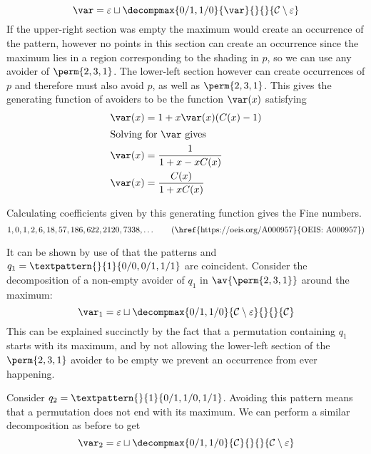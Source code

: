 \begin{equation*}
    \scriptvar = \varepsilon \sqcup
\decompmax{0/1,1/0}{\scriptvar}{}{}{\mathcal{C}\setminus\varepsilon}
\end{equation*}
If the upper-right section was empty the maximum would create an
occurrence of the pattern, however no points in this section can create
an occurrence since the maximum lies in a region corresponding to the
shading in \(p\), so we can use any avoider of \(\perm{2,3,1}\). The lower-left
section however can create occurrences
of \(p\) and therefore must also avoid \(p\), as well as \(\perm{2,3,1}\).
This gives the generating function of avoiders to be the function \(\var(x)\)
satisfying
\begin{align*}
    \var(x) &= 1 + x\var(x)(C(x)-1) \\
    \shortintertext{Solving for \(\var\) gives}
    \var(x) &= \frac{1}{1+x-xC(x)}\\
    \var(x) &= \frac{C(x)}{1+xC(x)}
\end{align*} %

\noindent
Calculating coefficients given by this generating function gives the Fine
numbers.
\begin{equation*}
    1, 0, 1, 2, 6, 18, 57, 186, 622, 2120, 7338,\dotsc
\tag{\href{https://oeis.org/A000957}{OEIS: A000957}}
\end{equation*}

\nextvar[\varfine]
It can be shown by use of  that the patterns
 and \(q_1 = \textpattern{}{1}{0/0,0/1,1/1}\) are
coincident. Consider the decomposition of a non-empty avoider of \(q_1\) in
\(\av{\perm{2,3,1}}\) around the maximum:
\begin{equation*}
    \scriptvar_1 =\varepsilon \sqcup
\decompmax{0/1,1/0}{\mathcal{C}\setminus\varepsilon}{}{}{\mathcal{C}}
\end{equation*}
This can be explained succinctly by the fact that a permutation containing
\(q_1\) starts with its maximum, and by not allowing the lower-left section of the
\(\perm{2,3,1}\) avoider to be empty we prevent an occurrence from ever
happening.

Consider \(q_2 = \textpattern{}{1}{0/1,1/0,1/1}\). Avoiding this pattern
means that a permutation does not end with its maximum. We can perform a
similar
decomposition as before to get
\begin{equation*}
    \mathcal{\var}_2 =\varepsilon \sqcup
\decompmax{0/1,1/0}{\mathcal{C}}{}{}{\mathcal{C}\setminus\varepsilon}
\end{equation*}

